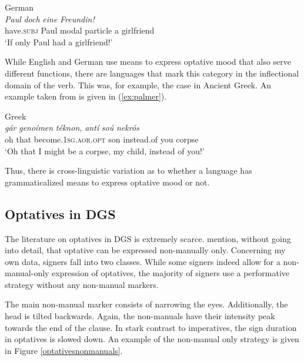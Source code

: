 \begin{exe}
\ex German \\  {\textit{Paul}} {\textit{doch}} {\textit{eine}} {\textit{Freundin!}}   \\
{have.\textsc{subj}} {Paul} {modal particle} {a} {girlfriend}\\
\trans `If only Paul had a girlfriend!' \label{ex:optativegermansubjunctive}
\end{exe}

\noindent While English and German use means to express optative mood that also serve different functions, there are languages that mark this category in the inflectional domain of the verb. This was, for example, the case in Ancient Greek. An example taken from \citet[216]{palmer2001mood} is given in (\ref{ex:palmer}).

\begin{exe}
\ex Greek \citep[216]{palmer2001mood} \\  {\textit{gár}} {\textit{genoíme\textlengthmark n}} {\textit{téknon,}} {\textit{antí}} {\textit{soú}} {\textit{nekrós}}          \\
{oh} {that} {become.1\textsc{sg.aor.opt}} {son} {instead.of} {you} {corpse}  \\
\trans `Oh that I might be a corpse, my child, instead of you!' \label{ex:palmer}
\end{exe}

\noindent Thus, there is cross-linguistic variation as to whether a language has grammaticalized means to express optative mood or not.

\subsection{Optatives in DGS}
The literature on optatives in DGS is extremely scarce. \citet[366]{happ2014vork} mention, without going into detail, that optative can be expressed non-manually only. Concerning my own data, signers fall into two classes. While some signers indeed allow for a non-manual-only expression of optatives, the majority of signers use a performative strategy without any non-manual markers.


The main non-manual marker consists of narrowing the eyes. Additionally, the head is tilted backwards. Again, the non-manuals have their intensity peak towards the end of the clause. In stark contrast to imperatives, the sign duration in optatives is slowed down.  An example of the non-manual only strategy is given in Figure \ref{optativesnonmanuals}.

